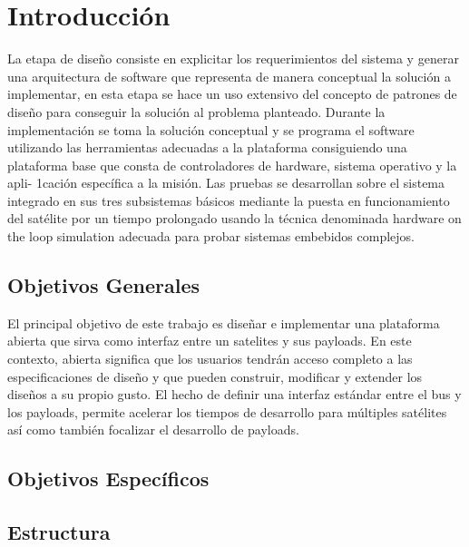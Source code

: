 \chapter{Introducción}
\label{ch:introduction}


La etapa de diseño consiste en explicitar los requerimientos del sistema y generar una
arquitectura de software que representa de manera conceptual la solución a implementar, en
esta etapa se hace un uso extensivo del concepto de patrones de diseño para conseguir la
solución al problema planteado. Durante la implementación se toma la solución conceptual y
se programa el software utilizando las herramientas adecuadas a la plataforma consiguiendo
una plataforma base que consta de controladores de hardware, sistema operativo y la apli-
1cación específica a la misión. Las pruebas se desarrollan sobre el sistema integrado en sus
tres subsistemas básicos mediante la puesta en funcionamiento del satélite por un tiempo
prolongado usando la técnica denominada hardware on the loop simulation adecuada para
probar sistemas embebidos complejos.



\section{Objetivos Generales}

El principal objetivo de este trabajo es diseñar e implementar una plataforma abierta que sirva como interfaz entre un satelites y sus payloads.  En este contexto, abierta significa que los usuarios tendrán acceso completo a las especificaciones de diseño y que pueden construir, modificar y extender los diseños a su propio gusto.  El hecho de definir una interfaz estándar entre el bus y los payloads, permite acelerar los tiempos de desarrollo para múltiples satélites así como también focalizar el desarrollo de payloads.

\section{Objetivos Específicos}

\section{Estructura}